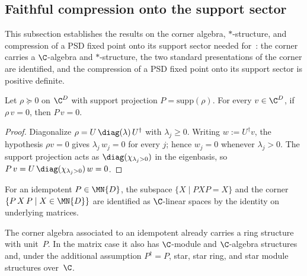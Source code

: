 \subsection{Faithful compression onto the support sector}

This subsection establishes the results on the corner algebra,
$*$-structure, and compression of a PSD fixed point onto its support sector
needed for~\cite[Corollary~6.6]{Wolf2012Quantum}: the corner carries a
$\C$-algebra and $*$-structure, the two standard presentations of the corner
are identified, and the compression of a PSD fixed point onto its support
sector is positive definite.

\begin{lemma}%
    \label{lem:supportProj_mulVec_eq_zero_of_mulVec_eq_zero}
    \leanok
    Let $\rho \succeq 0$ on $\C^D$ with support projection
    $P = \mathrm{supp}(\rho)$. For every $v \in \C^D$, if $\rho\, v = 0$,
    then $P\, v = 0$.
\end{lemma}
\begin{proof}\leanok
    Diagonalize $\rho = U\,\diag(\lambda)\,U^\dagger$ with
    $\lambda_j \ge 0$. Writing $w := U^\dagger v$, the hypothesis
    $\rho v = 0$ gives $\lambda_j\, w_j = 0$ for every $j$; hence $w_j = 0$
    whenever $\lambda_j > 0$. The support projection acts as
    $\diag(\chi_{\lambda_j > 0})$ in the eigenbasis, so
    $P\,v = U\,\diag(\chi_{\lambda_j > 0})\,w = 0$.
\end{proof}

\begin{definition}%
    \label{def:cornerSubmoduleCornerEquiv}
    \leanok
    For an idempotent $P \in \MN{D}$, the subspace
    $\{X \mid P X P = X\}$ and the corner
    $\{P\,X\,P \mid X \in \MN{D}\}$ are identified as $\C$-linear spaces by
    the identity on underlying matrices.
\end{definition}

\begin{remark}%
    \label{rem:corner_algebra_star_instances}
    \leanok
    The corner algebra associated to an idempotent already carries a ring
    structure with unit~$P$. In the matrix case it also has
    $\C$-module and $\C$-algebra structures and, under the additional
    assumption $P^\dagger = P$, star, star ring, and star module
    structures over~$\C$.
\end{remark}

